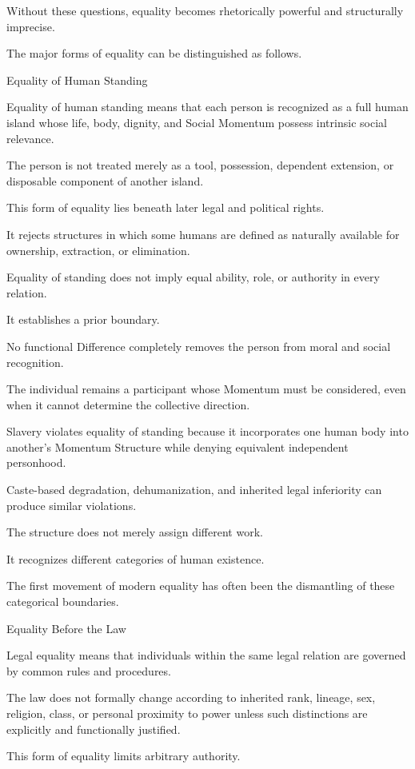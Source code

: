 Without these questions, equality becomes rhetorically powerful and structurally imprecise.

The major forms of equality can be distinguished as follows.

Equality of Human Standing

Equality of human standing means that each person is recognized as a full human island whose life, body, dignity, and Social Momentum possess intrinsic social relevance.

The person is not treated merely as a tool, possession, dependent extension, or disposable component of another island.

This form of equality lies beneath later legal and political rights.

It rejects structures in which some humans are defined as naturally available for ownership, extraction, or elimination.

Equality of standing does not imply equal ability, role, or authority in every relation.

It establishes a prior boundary.

No functional Difference completely removes the person from moral and social recognition.

The individual remains a participant whose Momentum must be considered, even when it cannot determine the collective direction.

Slavery violates equality of standing because it incorporates one human body into another’s Momentum Structure while denying equivalent independent personhood.

Caste-based degradation, dehumanization, and inherited legal inferiority can produce similar violations.

The structure does not merely assign different work.

It recognizes different categories of human existence.

The first movement of modern equality has often been the dismantling of these categorical boundaries.

Equality Before the Law

Legal equality means that individuals within the same legal relation are governed by common rules and procedures.

The law does not formally change according to inherited rank, lineage, sex, religion, class, or personal proximity to power unless such distinctions are explicitly and functionally justified.

This form of equality limits arbitrary authority.

